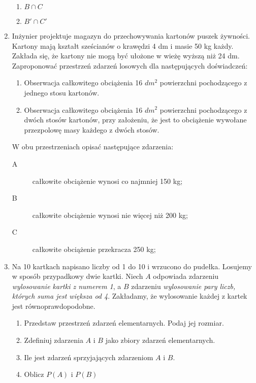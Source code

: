 \documentclass{mwart}
\newcommand{\ans}[1]{}
\newcommand{\ans}[1]{\emph{Odpowiedź:} #1}
\begin{document}
\begin{enumerate}
\begin{enumerate}
\item $B\cap C$
\item $B'\cap C'$
\end{enumerate}
\item Inżynier projektuje magazyn do przechowywania kartonów puszek żywności. Kartony mają kształt sześcianów o krawędzi 4 dm i masie 50 kg każdy. Zakłada się, że kartony nie mogą być ułożone w wieżę wyższą niż 24 dm. Zaproponować przestrzeń zdarzeń losowych dla następujących doświadczeń:
\begin{enumerate}
\item Obserwacja całkowitego obciążenia 16 $dm^2$ powierzchni pochodzącego z jednego stosu kartonów.
\item Obserwacja całkowitego obciążenia 16 $dm^2$ powierzchni pochodzącego z dwóch stosów kartonów, przy założeniu, że jest to obciążenie wywołane przezpolowę masy każdego z dwóch stosów.
\end{enumerate}
W obu przestrzeniach opisać następujące zdarzenia:
\begin{description}
\item[A] całkowite obciążenie wynosi co najmniej 150 kg;
\item[B] całkowite obciążenie wynosi nie więcej niż 200 kg;
\item[C] całkowite obciążenie przekracza 250 kg;
\end{description}
\item Na 10 kartkach napisano liczby od 1 do 10 i wrzucono do pudełka. Losujemy w sposób przypadkowy dwie kartki. Niech $A$ odpowiada zdarzeniu \emph{wylosowanie kartki z numerem 1}, a $B$ zdarzeniu \emph{wylosowanie pary liczb, których suma jest większa od 4}. Zakładamy, że wylosowanie każdej z kartek jest równoprawdopodobne.
\begin{enumerate}
\item Przedstaw przestrzeń zdarzeń elementarnych. Podaj jej rozmiar. \ans{$\Omega=\{\omega_{\{i,j\}}|i,j\in\{1,\ldots,10\} \land i\neq j\}, \left|\Omega\right|={10 \choose 2}=45$}
\item Zdefiniuj zdarzenia $A$ i $B$ jako zbiory zdarzeń elementarnych. \ans{$A=\{\omega_{\{i,j\}}\in\Omega|i=1 \lor j=1\}$, $B=\{\omega_{\{i,j\}}\in\Omega|i+j>4\}$}
\item Ile jest zdarzeń sprzyjających zdarzeniom $A$ i $B$. \ans{$\left|A\right|=9$, $\left|B\right|=45-4=41$}
\item Oblicz $P(A)$ i $P(B)$ \ans{$P(A)=\frac{9}{45}, P(B)=\frac{41}{45}$}
\end{enumerate}

\end{enumerate}
\end{document}
